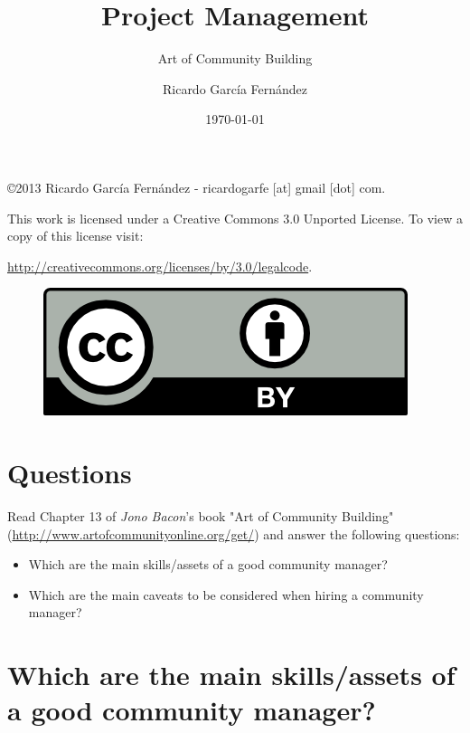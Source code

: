 \documentclass[11pt]{scrartcl}
\title{\textbf{Project Management}}
\subtitle{Art of Community Building}
\author{Ricardo Garc\'ia Fern\'andez}
\date{\today}
\begin{document}
\maketitle

\vfill

\begin{flushright}
    \copyright  2013 Ricardo Garc\'ia Fern\'andez - ricardogarfe [at] gmail [dot] com.

    This work is licensed under a Creative Commons 3.0 Unported License.
    To view a copy of this license visit:
 
    \url{http://creativecommons.org/licenses/by/3.0/legalcode}.
\end{flushright}

\begin{figure}[h]
    \begin{flushright}	
        \includegraphics{by}
        \label{fig:by}
    \end{flushright}
\end{figure}

\newpage

\section{Questions}

\par Read Chapter 13 of \emph{Jono Bacon}'s book "Art of Community Building" (\url{http://www.artofcommunityonline.org/get/}) and answer the following questions:

\begin{itemize}
	\item Which are the main skills/assets of a good community manager?
	\item Which are the main caveats to be considered when hiring a community manager?
\end{itemize}

\section{Which are the main skills/assets of a good community manager?}
\label{sec:main-skills}
\end{document}
